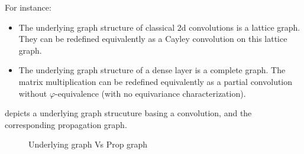 For instance:
\begin{itemize}
  \item The underlying graph structure of classical $2$d convolutions is a lattice graph. They can be redefined equivalently as a Cayley convolution on this lattice graph.
  \item The underlying graph structure of a dense layer is a complete graph. The matrix multiplication can be redefined equivalently as a partial convolution without $\varphi$-equivalence (\ie with no equivariance characterization).
\end{itemize}

 depicts a underlying graph strucuture basing a convolution, and the corresponding propagation graph.

\begin{figure}[H]
\centering
{}
\caption{Underlying graph Vs Prop graph}
\label{fig:upgraph}
\end{figure}